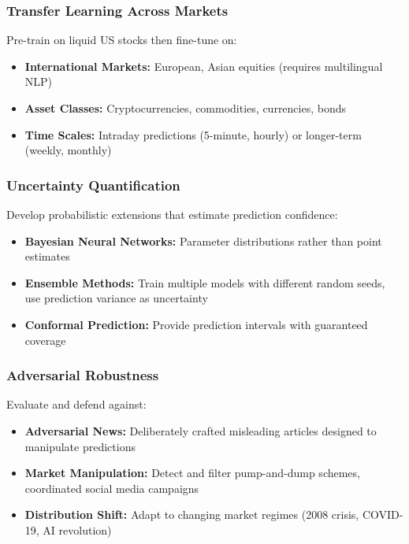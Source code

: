 \documentclass[conference]{IEEEtran}
\begin{document}
\subsubsection{Transfer Learning Across Markets}
Pre-train on liquid US stocks then fine-tune on:

\begin{itemize}
\item \textbf{International Markets:} European, Asian equities (requires multilingual NLP)
\item \textbf{Asset Classes:} Cryptocurrencies, commodities, currencies, bonds
\item \textbf{Time Scales:} Intraday predictions (5-minute, hourly) or longer-term (weekly, monthly)
\end{itemize}

\subsubsection{Uncertainty Quantification}
Develop probabilistic extensions that estimate prediction confidence:

\begin{itemize}
\item \textbf{Bayesian Neural Networks:} Parameter distributions rather than point estimates
\item \textbf{Ensemble Methods:} Train multiple models with different random seeds, use prediction variance as uncertainty
\item \textbf{Conformal Prediction:} Provide prediction intervals with guaranteed coverage
\end{itemize}

\subsubsection{Adversarial Robustness}
Evaluate and defend against:

\begin{itemize}
\item \textbf{Adversarial News:} Deliberately crafted misleading articles designed to manipulate predictions
\item \textbf{Market Manipulation:} Detect and filter pump-and-dump schemes, coordinated social media campaigns
\item \textbf{Distribution Shift:} Adapt to changing market regimes (2008 crisis, COVID-19, AI revolution)
\end{itemize}
\end{document}
